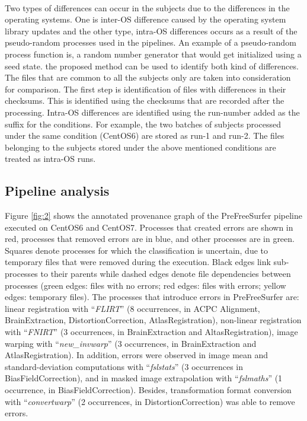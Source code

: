 \documentclass{article}
\begin{document}
\paragraph{}
Two types of differences can occur in the subjects due to the differences in the operating systems. 
One is inter-OS difference caused by the operating system library updates and the other type,
 intra-OS differences occurs as a result of the pseudo-random processes used in the pipelines.
 An example of a pseudo-random process function is, a random number generator that would get initialized 
using a seed state. the proposed method can be used to identify both kind of differences. 
The files that are common to all the subjects only are taken into consideration for comparison. The first step
 is identification of files with differences in their checksums. This is identified using the checksums that are
 recorded after the processing. Intra-OS differences are identified using the run-number added as the suffix for
 the conditions. For example, the two batches of subjects processed under the same condition (CentOS6) are stored 
as run-1 and run-2. The files belonging to the subjects stored under the above mentioned conditions are treated as intra-OS runs.



\subsection{Pipeline analysis}

Figure \ref{fig:2} shows the annotated provenance graph of the
PreFreeSurfer pipeline executed on CentOS6 and CentOS7.  Processes
that created errors are shown in red, processes that removed errors
are in blue, and other processes are in green.  Squares denote
processes for which the classification is uncertain, due to temporary
files that were removed during the execution. Black edges link
sub-processes to their parents while dashed edges denote file
dependencies between processes (green edges: files with no errors; red
edges: files with errors; yellow edges: temporary files).  The
processes that introduce errors in PreFreeSurfer are: linear
registration with “\emph{FLIRT}” (8 occurrences, in ACPC Alignment,
BrainExtraction, DistortionCorrection, AtlasRegistration), non-linear
registration with “\emph{FNIRT}” (3 occurrences, in BrainExtraction
and AltasRegistration), image warping with “\emph{new\_invwarp}” (3
occurrences, in BrainExtraction and AtlasRegistration).  In addition,
errors were observed in image mean and standard-deviation computations
with “\emph{fslstats}” (3 occurrences in BiasFieldCorrection), and in
masked image extrapolation with “\emph{fslmaths}” (1 occurrence, in
BiasFieldCorrection).  Besides, transformation format conversion with
“\emph{convertwarp}” (2 occurrences, in DistortionCorrection) was able
to remove errors.
\end{document}
